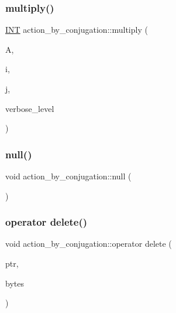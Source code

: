 \mbox{\label{classaction__by__conjugation_ab037d299b507b763584a6e87b8069f04}} 
\subsubsection{\texorpdfstring{multiply()}{multiply()}}
{\footnotesize\ttfamily \mbox{\hyperlink{galois_8h_a09fddde158a3a20bd2dcadb609de11dc}{I\+NT}} action\+\_\+by\+\_\+conjugation\+::multiply (\begin{DoxyParamCaption}\item[{\mbox{\hyperlink{classaction}{action}} $\ast$}]{A,  }\item[{\mbox{\hyperlink{galois_8h_a09fddde158a3a20bd2dcadb609de11dc}{I\+NT}}}]{i,  }\item[{\mbox{\hyperlink{galois_8h_a09fddde158a3a20bd2dcadb609de11dc}{I\+NT}}}]{j,  }\item[{\mbox{\hyperlink{galois_8h_a09fddde158a3a20bd2dcadb609de11dc}{I\+NT}}}]{verbose\+\_\+level }\end{DoxyParamCaption})}

\mbox{\label{classaction__by__conjugation_aadc034b92d79634208c083893675331e}} 
\subsubsection{\texorpdfstring{null()}{null()}}
{\footnotesize\ttfamily void action\+\_\+by\+\_\+conjugation\+::null (\begin{DoxyParamCaption}{ }\end{DoxyParamCaption})}

\mbox{\label{classaction__by__conjugation_a94fd63f468c02381446d3d666e34efdd}} 
\subsubsection{\texorpdfstring{operator delete()}{operator delete()}}
{\footnotesize\ttfamily void action\+\_\+by\+\_\+conjugation\+::operator delete (\begin{DoxyParamCaption}\item[{void $\ast$}]{ptr,  }\item[{size\+\_\+t}]{bytes }\end{DoxyParamCaption})}

